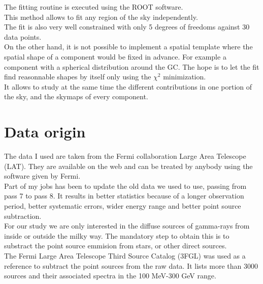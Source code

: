 The fitting routine is executed using the ROOT software. \\

This method allows to fit any region of the sky independently.\\

The fit is also very well constrained with only 5 degrees of freedoms against 30 data points.\\

On the other hand, it is not possible to implement a spatial template where the spatial shape of a component would be fixed in advance. For example a component with a spherical distribution around the GC. The hope is to let the fit find reasonnable shapes by itself only using the $\chi ^2$ minimization.\\

It allows to study at the same time the different contributions in one portion of the sky, and the skymaps of every component.\\


\section{Data origin}

The data I used are taken from the Fermi collaboration Large Area Telescope (LAT). They are available on the web and can be treated by anybody using the software given by Fermi.\\

Part of my jobs has been to update the old data we used to use, passing from pass 7 to pass 8. It results in better statistics because of a longer observation period, better systematic errors, wider energy range and better point source subtraction.\\

For our study we are only interested in the diffuse sources of gamma-rays from inside or outside the milky way. The mandatory step to obtain this is to substract the point source emmision from stars, or other direct sources.\\

The Fermi Large Area Telescope Third Source Catalog (3FGL) was used as a reference to subtract the point sources from the raw data. It lists more than 3000 sources and their associated spectra in the 100 MeV-300 GeV range.\\



